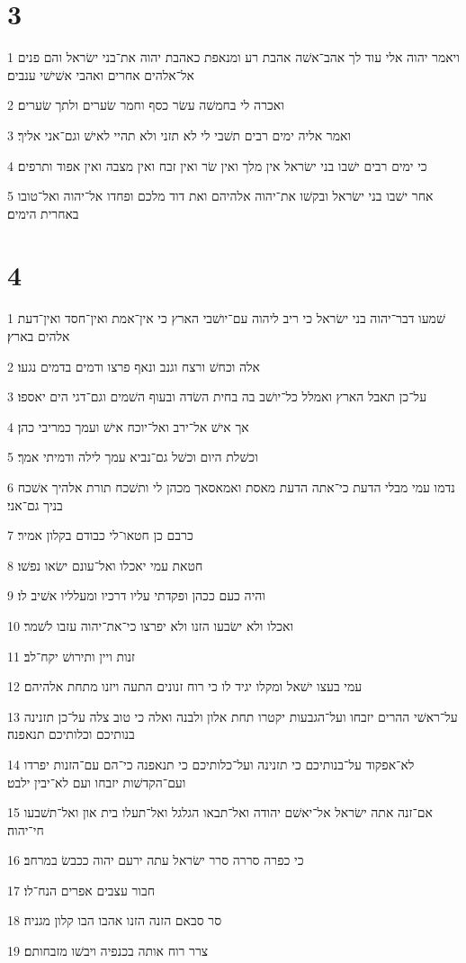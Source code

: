 \chapter{3}

\par 1 ויאמר יהוה אלי עוד לך אהב־אשׁה אהבת רע ומנאפת כאהבת יהוה את־בני ישׂראל והם פנים אל־אלהים אחרים ואהבי אשׁישׁי ענבים׃
\par 2 ואכרה לי בחמשׁה עשׂר כסף וחמר שׂערים ולתך שׂערים׃
\par 3 ואמר אליה ימים רבים תשׁבי לי לא תזני ולא תהיי לאישׁ וגם־אני אליך׃
\par 4 כי ימים רבים ישׁבו בני ישׂראל אין מלך ואין שׂר ואין זבח ואין מצבה ואין אפוד ותרפים׃
\par 5 אחר ישׁבו בני ישׂראל ובקשׁו את־יהוה אלהיהם ואת דוד מלכם ופחדו אל־יהוה ואל־טובו באחרית הימים׃

\chapter{4}

\par 1 שׁמעו דבר־יהוה בני ישׂראל כי ריב ליהוה עם־יושׁבי הארץ כי אין־אמת ואין־חסד ואין־דעת אלהים בארץ׃
\par 2 אלה וכחשׁ ורצח וגנב ונאף פרצו ודמים בדמים נגעו׃
\par 3 על־כן תאבל הארץ ואמלל כל־יושׁב בה בחית השׂדה ובעוף השׁמים וגם־דגי הים יאספו׃
\par 4 אך אישׁ אל־ירב ואל־יוכח אישׁ ועמך כמריבי כהן׃
\par 5 וכשׁלת היום וכשׁל גם־נביא עמך לילה ודמיתי אמך׃
\par 6 נדמו עמי מבלי הדעת כי־אתה הדעת מאסת ואמאסאך מכהן לי ותשׁכח תורת אלהיך אשׁכח בניך גם־אני׃
\par 7 כרבם כן חטאו־לי כבודם בקלון אמיר׃
\par 8 חטאת עמי יאכלו ואל־עונם ישׂאו נפשׁו׃
\par 9 והיה כעם ככהן ופקדתי עליו דרכיו ומעלליו אשׁיב לו׃
\par 10 ואכלו ולא ישׂבעו הזנו ולא יפרצו כי־את־יהוה עזבו לשׁמר׃
\par 11 זנות ויין ותירושׁ יקח־לב׃
\par 12 עמי בעצו ישׁאל ומקלו יגיד לו כי רוח זנונים התעה ויזנו מתחת אלהיהם׃
\par 13 על־ראשׁי ההרים יזבחו ועל־הגבעות יקטרו תחת אלון ולבנה ואלה כי טוב צלה על־כן תזנינה בנותיכם וכלותיכם תנאפנה׃
\par 14 לא־אפקוד על־בנותיכם כי תזנינה ועל־כלותיכם כי תנאפנה כי־הם עם־הזנות יפרדו ועם־הקדשׁות יזבחו ועם לא־יבין ילבט׃
\par 15 אם־זנה אתה ישׂראל אל־יאשׁם יהודה ואל־תבאו הגלגל ואל־תעלו בית און ואל־תשׁבעו חי־יהוה׃
\par 16 כי כפרה סררה סרר ישׂראל עתה ירעם יהוה ככבשׂ במרחב׃
\par 17 חבור עצבים אפרים הנח־לו׃
\par 18 סר סבאם הזנה הזנו אהבו הבו קלון מגניה׃
\par 19 צרר רוח אותה בכנפיה ויבשׁו מזבחותם׃

